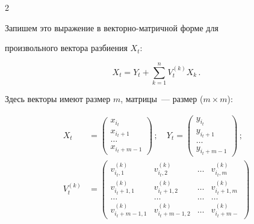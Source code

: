 \begin{multicols}{2}
\begin{equation}
     \label{e2ol}


     \end{equation}


 


     Запишем это выражение в векторно-матричной форме для


произвольного вектора разбиения $X_t$:


     \begin{equation}


     X_t = Y_t +\sum\limits_{k=1}^n V_t^{(k)} X_k\,.


     \label{e3ol}


     \end{equation}


     Здесь векторы имеют размер $m$, матрицы~--- размер ($m\times m$):


     \begin{align*}


     X_t &= \begin{pmatrix}


     x_{i_t}\\ x_{i_t+1}\\ \ldots\\ x_{i_t+m-1}


     \end{pmatrix}\,;\quad


     Y_t = \begin{pmatrix}


     y_{i_t}\\ y_{i_t+1}\\ \ldots\\ y_{i_t+m-1}


     \end{pmatrix}\,;\\[6pt]


     V_t^{(k)} & =


     \begin{pmatrix}


     v^{(k)}_{i_t,1} & v^{(k)}_{i_t,2} & \ldots & v^{(k)}_{i_t,m}\\


     v^{(k)}_{i_t+1,1} & v^{(k)}_{i_t+1,2} & \ldots & v^{(k)}_{i_t+1,m}\\


     \ldots & \ldots & \ldots & \ldots\\


     v^{(k)}_{i_t+m-1,1} & v^{(k)}_{i_t+m-1,2} & \ldots & v^{(k)}_{i_t+m-


}
\end{pmatrix}
\end{align*}
\end{multicols}
